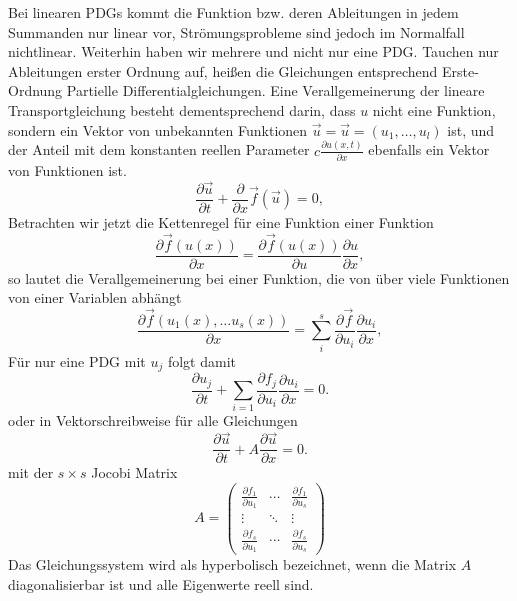 Bei linearen PDGs kommt die Funktion bzw. deren Ableitungen in jedem
Summanden nur linear vor, Strömungsprobleme sind jedoch im Normalfall
nichtlinear. Weiterhin haben wir mehrere und nicht nur eine PDG.
Tauchen nur Ableitungen erster Ordnung auf, heißen die Gleichungen
entsprechend Erste-Ordnung Partielle Differentialgleichungen. Eine
Verallgemeinerung der lineare Transportgleichung besteht
dementsprechend darin, dass $u$ nicht eine Funktion, sondern ein
Vektor von unbekannten Funktionen $\vec{u} = \vec{u} =
(u_1,\ldots,u_l)$ ist, und der Anteil mit dem konstanten reellen
Parameter $c \frac{\partial u(x,t)}{\partial x}$ ebenfalls ein Vektor
  von Funktionen ist.
\begin{equation}
\frac{\partial \vec u}{\partial t} + 
\frac{\partial}{\partial x} \vec {f} (\vec u) = 0,
\end{equation}
Betrachten wir jetzt die Kettenregel für eine Funktion einer Funktion
\begin{equation}
\frac{\partial \vec f(u(x))}{\partial x} = \frac{\partial\vec
  {f}(u(x)) }{\partial u} \frac{\partial u}{\partial x},\nonumber
\end{equation}
so lautet die Verallgemeinerung bei einer Funktion, die von über viele
Funktionen von einer Variablen abhängt
\begin{equation}
\frac{\partial \vec {f} (u_1(x),\ldots u_s(x))}{\partial x} = \sum_i^s
\frac{\partial\vec {f} }{\partial u_i} \frac{\partial u_i}{\partial
  x},
\end{equation}
Für nur eine PDG mit $u_j$ folgt damit
\begin{equation}
\frac{\partial u_j}{\partial t} + \sum_{i=1}
\frac{\partial f_j }{\partial u_i} \frac{\partial u_i}{\partial
  x} = 0.
\end{equation}
oder in Vektorschreibweise für alle Gleichungen
\begin{equation}
\frac{\partial \vec u}{\partial t} + A 
\frac{\partial \vec u}{\partial x} = 0.
\end{equation}
mit der $s \times s$ Jocobi Matrix
\begin{equation}
A =
\left(\begin{array}  {ccc}
\frac{\partial f_1}{\partial u_1} & \cdots &
  \frac{\partial f_1}{\partial u_s} \\ \vdots & \ddots & \vdots
  \\ \frac{\partial f_s}{\partial u_1} & \cdots & \frac{\partial
    f_s}{\partial u_s} 
\end{array}\right)
\end{equation}
Das Gleichungssystem wird als hyperbolisch bezeichnet, wenn die Matrix
$A$ diagonalisierbar ist und alle Eigenwerte reell sind.

